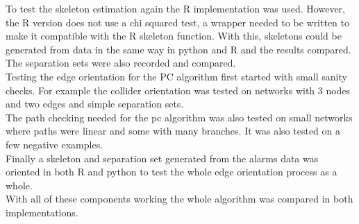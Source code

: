 \documentclass{article}
\begin{document}
To test the skeleton estimation again the R implementation was used. However, the R version does not use a chi squared test, a wrapper needed to be written to make it compatible with the R skeleton function. With this, skeletons could be generated from data in the same way in python and R and the results compared. The separation sets were also recorded and compared.\\

Testing the edge orientation for the PC algorithm first started with small sanity checks. For example the collider orientation was tested on networks with 3 nodes and two edges and simple separation sets.\\

The path checking needed for the pc algorithm was also 
tested on small networks where paths were linear and some with many branches. It was also tested on a few negative examples.\\

Finally a skeleton and separation set generated from the alarms data was oriented in both R and python to test the whole edge orientation process as a whole.\\

With all of these components working the whole algorithm was compared in both implementations.\\
\end{document}
